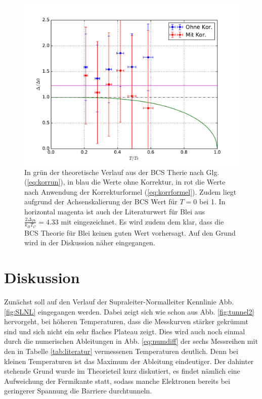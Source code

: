 \documentclass[twoside,        %
               BCOR12mm,       %
               english,ngerman, %
               fleqn,headsepline=false,footsepline=false
              ]{MFPREPORT}
\begin{document}
\begin{figure}[h]
\includegraphics[scale=0.9]{4.pdf}
\caption{
In grün der theoretische Verlauf aus der BCS Therie nach Glg. (\ref{eq:korrun}), in blau die Werte ohne Korrektur, in rot die Werte nach Anwendung der Korrekturformel (\ref{eq:korrformel}).
Zudem liegt aufgrund der Achsenskalierung der BCS Wert für $T=0$ bei 1. 
In horizontal magenta ist auch der Literaturwert für Blei aus $\frac{2 \Delta_{Pb}}{k_{B} T_{C}} = 4.33 $ mit eingezeichnet. Es wird zudem dem klar, dass die BCS Theorie für Blei keinen guten Wert vorhersagt.
Auf den Grund wird in der Diskussion näher eingegangen.}
\label{fig:NLNL}
\end{figure}


\section{Diskussion}
Zunächst soll auf den Verlauf der Supraleiter-Normalleiter Kennlinie Abb. \ref{fig:SLNL} eingegangen werden.
Dabei zeigt sich wie schon aus Abb. \ref{fig:tunnel2} hervorgeht, bei höheren Temperaturen, dass die Messkurven stärker gekrümmt sind und 
sich nicht ein sehr flaches Plateau zeigt. 
Dies wird auch noch einmal durch die numerischen Ableitungen in Abb. \ref{eq:numdiff} der sechs Messreihen mit den in Tabelle \ref{tab:literatur} vermessenen Temperaturen deutlich.
Denn bei kleinen Temperaturen ist das Maximum der Ableitung eindeutiger.
Der dahinter stehende Grund wurde im Theorieteil kurz diskutiert, es findet nämlich eine Aufweichung der Fermikante statt, sodass manche Elektronen bereits bei geringerer Spannung die Barriere durchtunneln.
\end{document}
